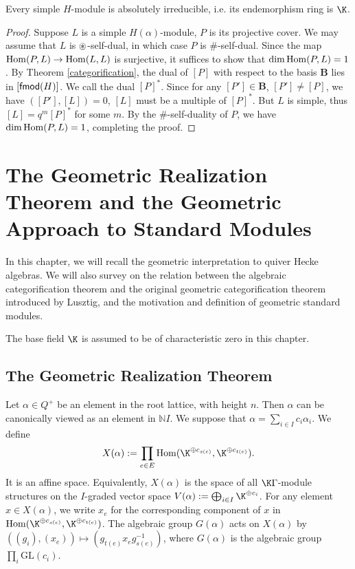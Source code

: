\begin{corollary}[{\cite[Corollary 3.19]{KL1}}]
    Every simple $H$-module is absolutely irreducible, i.e. its 
    endemorphism ring is $\K$.
\end{corollary}

\begin{proof}
    Suppose $L$ is a simple $H(\alpha)$-module, $P$ is its projective cover.
    We may assume that $L$ is $\circledast$-self-dual, in which case $P$ is $\#$-self-dual.
    Since the map $\operatorname{Hom}(P,L)\to\operatorname{Hom}(L,L)$ is surjective, it suffices to show
    that $\dim\operatorname{Hom}(P,L) = 1$. By Theorem \ref{categorification},
    the dual of $[P]$ with respect to the basis $\mathbf{B}$ lies in
    $[\mathsf{fmod}(H)]$. We call the dual $[P]^*$. Since for any $[P']\in\mathbf{B}$,
    $[P']\ne[P]$, we have $([P'],[L]) = 0$, $[L]$ must be a multiple of $[P]^*$.
    But $L$ is simple, thus $[L] = q^m[P]^*$ for some $m$. By the $\#$-self-duality
    of $P$, we have $\dim\operatorname{Hom}(P,L) = 1$, completing the proof.
\end{proof}

\chapter{The Geometric Realization Theorem and the Geometric Approach to Standard Modules}

In this chapter, we will recall the geometric interpretation to 
quiver Hecke algebras. We will also survey on the relation
between the algebraic categorification theorem and the 
original geometric categorification theorem introduced by Lusztig,
and the motivation and definition of geometric standard modules. 

The base field $\K$ is assumed to be of characteristic zero in this chapter.

\section{The Geometric Realization Theorem}

Let $\alpha\in Q^+$ be an element in the root lattice, with height $n$.
Then $\alpha$ can be canonically viewed as an element in $\mathbb{N}I$.
We suppose that $\alpha = \sum_{i\in I}c_i\alpha_i$.
We define $$X(\alpha) := \prod_{e\in E}\Hom(\K^{\oplus c_{s(e)}},\K^{\oplus c_{t(e)}}).$$
It is an affine space. Equivalently, $X(\alpha)$ is the space
of all $\K\Gamma$-module structures on the $I$-graded vector space
$V(\alpha) := \bigoplus_{i\in I}\K^{\oplus c_i}$.
For any element $x\in X(\alpha)$, we write $x_e$ for the corresponding component of $x$
in $\Hom(\K^{\oplus c_{s(e)}},\K^{\oplus c_{t(e)}})$. The algebraic group
$G(\alpha)$ acts on $X(\alpha)$ by $((g_i),(x_e))\mapsto
(g_{t(e)}x_eg_{s(e)}^{-1})$, where $G(\alpha)$ is the 
algebraic group $\prod_{i}\mathrm{GL}(c_i)$.

